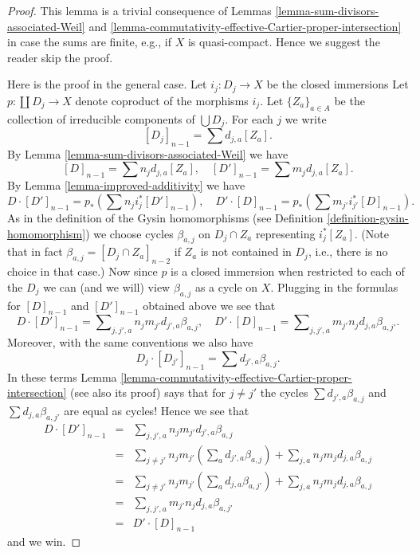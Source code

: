 \begin{proof}
This lemma is a trivial consequence of
Lemmas \ref{lemma-sum-divisors-associated-Weil} and
\ref{lemma-commutativity-effective-Cartier-proper-intersection}
in case the sums are finite, e.g., if $X$ is quasi-compact.
Hence we suggest the reader skip the proof.

\medskip\noindent
Here is the proof in the general case.
Let $i_j : D_j \to X$ be the closed immersions
Let $p : \coprod D_j \to X$ denote coproduct of the morphisms $i_j$.
Let $\{Z_a\}_{a \in A}$ be the collection of irreducible components of
$\bigcup D_j$. For each $j$ we write
$$
[D_j]_{n - 1} = \sum d_{j, a}[Z_a].
$$
By Lemma \ref{lemma-sum-divisors-associated-Weil} we have
$$
[D]_{n - 1} = \sum n_j d_{j, a} [Z_a],
\quad
[D']_{n - 1} = \sum m_j d_{j, a} [Z_a].
$$
By Lemma \ref{lemma-improved-additivity}
we have
$$
D \cdot [D']_{n - 1} = p_*\left(\sum n_j i_j^*[D']_{n - 1} \right),
\quad
D' \cdot [D]_{n - 1} = p_*\left(\sum m_{j'} i_{j'}^*[D]_{n - 1} \right).
$$
As in the definition of the Gysin homomorphisms (see
Definition \ref{definition-gysin-homomorphism})
we choose cycles $\beta_{a, j}$ on $D_j \cap Z_a$ representing
$i_j^*[Z_a]$. (Note that in fact $\beta_{a, j} = [D_j \cap Z_a]_{n - 2}$
if $Z_a$ is not contained in $D_j$, i.e., there is no choice in that case.)
Now since $p$ is a closed immersion when restricted to each of the $D_j$
we can (and we will) view $\beta_{a, j}$ as a cycle on $X$.
Plugging in the formulas for $[D]_{n - 1}$ and $[D']_{n - 1}$ obtained
above we see that
$$
D \cdot [D']_{n - 1} =
\sum\nolimits_{j, j', a} n_j m_{j'} d_{j', a} \beta_{a, j},
\quad
D' \cdot [D]_{n - 1} =
\sum\nolimits_{j, j', a} m_{j'} n_j d_{j, a} \beta_{a, j'}.
$$
Moreover, with the same conventions we also have
$$
D_j \cdot [D_{j'}]_{n - 1} = \sum d_{j', a} \beta_{a, j}.
$$
In these terms
Lemma \ref{lemma-commutativity-effective-Cartier-proper-intersection}
(see also its proof)
says that for $j \not = j'$ the cycles
$\sum d_{j', a} \beta_{a, j}$ and $\sum d_{j, a} \beta_{a, j'}$
are equal as cycles! Hence we see that
\begin{eqnarray*}
D \cdot [D']_{n - 1}
& = &
\sum\nolimits_{j, j', a} n_j m_{j'} d_{j', a} \beta_{a, j} \\
& = &
\sum\nolimits_{j \not = j'} n_j m_{j'}
\left(\sum\nolimits_a d_{j', a} \beta_{a, j}\right) +
\sum\nolimits_{j, a} n_j m_j d_{j, a} \beta_{a, j} \\
& = &
\sum\nolimits_{j \not = j'} n_j m_{j'}
\left(\sum\nolimits_a d_{j, a} \beta_{a, j'}\right) +
\sum\nolimits_{j, a} n_j m_j d_{j, a} \beta_{a, j} \\
& = &
\sum\nolimits_{j, j', a} m_{j'} n_j d_{j, a} \beta_{a, j'} \\
& = &
D' \cdot [D]_{n - 1}
\end{eqnarray*}
and we win.
\end{proof}

